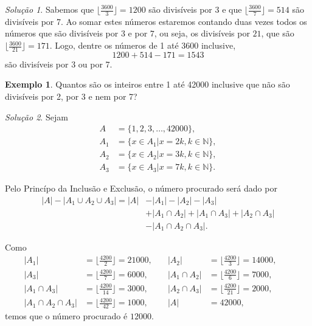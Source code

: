 \documentclass[]{book}
\theoremstyle{definition}
\theoremstyle{definition}
\newtheorem{example}{Exemplo}[chapter]
\theoremstyle{definition}
\theoremstyle{remark}
\newtheorem*{solution}{Solução}
\begin{document}
\begin{solution}
\iffalse{} {Solução. } \fi{}Sabemos que \(\big\lfloor{\frac{3600}{3}}\big\rfloor=1200\) são divisíveis por \(3\) e que \(\big\lfloor{\frac{3600}{7}}\big\rfloor=514\) são divisíveis por 7.
Ao somar estes números estaremos contando duas vezes todos os números que são divisíveis por \(3\) e por \(7\), ou seja, os divisíveis por \(21\), que são \(\big\lfloor{\frac{3600}{21}}\big\rfloor=171\).
Logo, dentre os números de 1 até 3600 inclusive,
\[1200 + 514 - 171 = 1543\]
são divisíveis por 3 ou por 7.
\end{solution}

\begin{example}
\protect\hypertarget{exm:div3Numeros}{}{\label{exm:div3Numeros} }Quantos são os inteiros entre 1 até 42000 inclusive que não são divisíveis por 2, por 3 e nem por 7?
\end{example}

\begin{solution}
\iffalse{} {Solução. } \fi{}Sejam
\begin{align}
A &= \{1, 2, 3, \ldots, 42000\}, \\
A_1 &= \{x \in A_1 | x = 2k, k \in \mathbb{N}\}, \\
A_2 &= \{x \in A_2 | x = 3k, k \in \mathbb{N}\}, \\
A_3 &= \{x \in A_3 | x = 7k, k \in \mathbb{N}\}.
\end{align}

Pelo Princípo da Inclusão e Exclusão, o número procurado será dado por
\begin{align} 
|A| - |A_1\cup A_2 \cup A_3| = |A| &- |A_1| - |A_2| - |A_3| \\
 &+ |A_1 \cap A_2| + |A_1 \cap A_3|+ |A_2 \cap A_3| \\ 
 &- |A_1 \cap A_2 \cap A_3|.
\end{align}

Como
\begin{align} 
|A_1| &= \bigg\lfloor{\frac{4200}{2}}\bigg\rfloor=21000, &\quad 
  |A_2| &= \bigg\lfloor{\frac{4200}{3}}\bigg\rfloor=14000, &\quad \\
  |A_3| &= \bigg\lfloor{\frac{4200}{7}}\bigg\rfloor=6000, &\quad 
|A_1 \cap A_2| &= \bigg\lfloor{\frac{4200}{6}}\bigg\rfloor=7000, &\quad \\
  |A_1 \cap A_3| &= \bigg\lfloor{\frac{4200}{14}}\bigg\rfloor=3000, &\quad 
  |A_2 \cap A_3| &= \bigg\lfloor{\frac{4200}{21}}\bigg\rfloor=2000, &\quad\\
|A_1 \cap A_2 \cap A_3| &= \bigg\lfloor{\frac{4200}{42}}\bigg\rfloor=1000, &\quad
  |A| &= 42000,
\end{align}
temos que o número procurado é \(12000\).
\end{solution}
\end{document}
